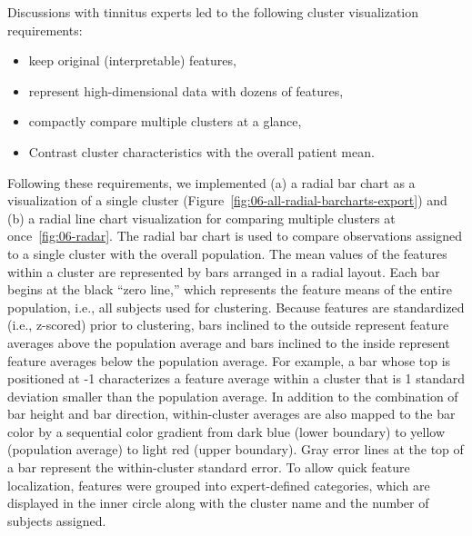 \documentclass[
  oneside]{book}
\providecommand{\tightlist}{%
  \setlength{\itemsep}{0pt}\setlength{\parskip}{0pt}}
\begin{document}
Discussions with tinnitus experts led to the following cluster visualization requirements:

\begin{itemize}
\tightlist
\item
  keep original (interpretable) features,
\item
  represent high-dimensional data with dozens of features,
\item
  compactly compare multiple clusters at a glance,
\item
  Contrast cluster characteristics with the overall patient mean.
\end{itemize}

Following these requirements, we implemented (a) a radial bar chart as a visualization of a single cluster (Figure~\ref{fig:06-all-radial-barcharts-export}) and (b) a radial line chart visualization for comparing multiple clusters at once~\ref{fig:06-radar}.
The radial bar chart is used to compare observations assigned to a single cluster with the overall population.
The mean values of the features within a cluster are represented by bars arranged in a radial layout.
Each bar begins at the black ``zero line,'' which represents the feature means of the entire population, i.e., all subjects used for clustering.
Because features are standardized (i.e., z-scored) prior to clustering, bars inclined to the outside represent feature averages above the population average and bars inclined to the inside represent feature averages below the population average.
For example, a bar whose top is positioned at -1 characterizes a feature average within a cluster that is 1 standard deviation smaller than the population average.
In addition to the combination of bar height and bar direction, within-cluster averages are also mapped to the bar color by a sequential color gradient from dark blue (lower boundary) to yellow (population average) to light red (upper boundary).
Gray error lines at the top of a bar represent the within-cluster standard error.
To allow quick feature localization, features were grouped into expert-defined categories, which are displayed in the inner circle along with the cluster name and the number of subjects assigned.
\end{document}
